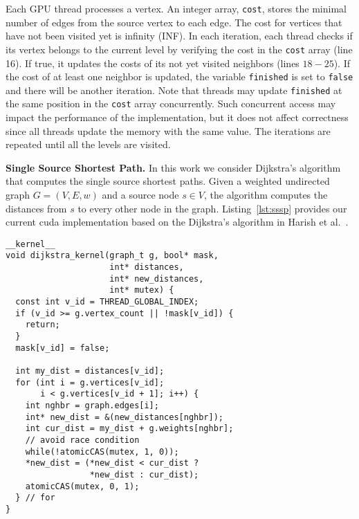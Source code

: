 Each GPU thread processes a vertex. An integer array, \texttt{cost}, stores the minimal number of edges from the source vertex to each edge. The cost for vertices that have not been visited yet is infinity (INF). In each iteration, each thread checks if its vertex belongs to the current level by verifying the cost in the \texttt{cost} array (line 16). If true, it updates the costs of its not yet visited neighbors (lines $18-25$). If the cost of at least one neighbor is updated, the variable \texttt{finished} is set to \texttt{false} and there will be another iteration. Note that threads may update \texttt{finished} at the same position in the \texttt{cost} array concurrently. Such concurrent access may impact the performance of the implementation, but it does not affect correctness since all threads update the memory with the same value. The iterations are repeated until all the levels are visited.

{\bf Single Source Shortest Path.} In this work we consider Dijkstra's algorithm that computes the single source shortest paths. Given a weighted undirected graph $G = (V, E, w)$ and a source node $s \in V$, the algorithm computes the distances from $s$ to every other node in the graph. Listing~\ref{lst:sssp} provides our current {\sc cuda} implementation based on the Dijkstra's algorithm in Harish et al.~\cite{Harish2007}.


\begin{lstlisting}[caption=GPU implementation of Single Source Shortest Path algorithm,label=lst:sssp]
__kernel__
void dijkstra_kernel(graph_t g, bool* mask, 
                     int* distances, 
                     int* new_distances, 
                     int* mutex) {
  const int v_id = THREAD_GLOBAL_INDEX;
  if (v_id >= g.vertex_count || !mask[v_id]) {
    return;
  }
  mask[v_id] = false;

  int my_dist = distances[v_id];
  for (int i = g.vertices[v_id]; 
       i < g.vertices[v_id + 1]; i++) {
    int nghbr = graph.edges[i];
    int* new_dist = &(new_distances[nghbr]);
    int cur_dist = my_dist + g.weights[nghbr];
    // avoid race condition
    while(!atomicCAS(mutex, 1, 0));
    *new_dist = (*new_dist < cur_dist ? 
                 *new_dist : cur_dist);
    atomicCAS(mutex, 0, 1);
  } // for
}
\end{lstlisting}

